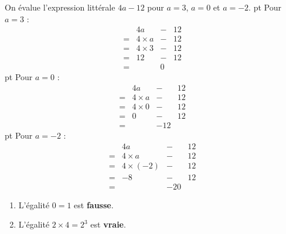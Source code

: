 \documentclass{thecours}
\begin{document}
    \newpage
        \vskip5pt\par{}\vskip5pt\par\noindent
            On évalue l'expression littérale $4a-12$ pour $a=3$, $a=0$ et $a=-2$.
             pt
            Pour $a=3$ :
            $$\begin{array}{cccc}
                &4a&-&12\\
                =&4\times a&-&12\\
                =&4\times 3&-&12\\
                =&12&-&12\\
                =&&0&
            \end{array}$$
             pt
            Pour $a=0$ :
            $$\begin{array}{cccc}
                &4a&-&12\\
                =&4\times a&-&12\\
                =&4\times 0&-&12\\
                =&0&-&12\\
                =&&-12&
            \end{array}$$
             pt
            Pour $a=-2$ :
            $$\begin{array}{cccc}
                &4a&-&12\\
                =&4\times a&-&12\\
                =&4\times(-2)&-&12\\
                =&-8&-&12\\
                =&&-20&
            \end{array}$$
        \vskip5pt\par{}\vskip5pt\par\noindent
            \begin{enumerate}
                \item L'égalité $0=1$ est {\bfseries fausse}.
                \item L'égalité $2\times 4=2^3$ est {\bfseries vraie}.
            \end{enumerate}\bigbreak
        \vskip5pt\par{}\vskip5pt\par\noindent
\end{document}
